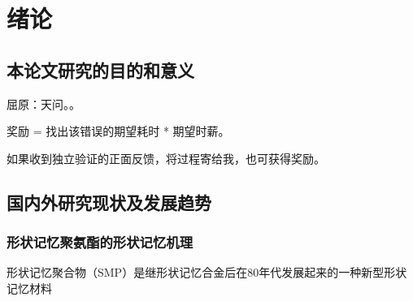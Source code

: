

\label{第一章开始}
\chapter{绪论}

\section{本论文研究的目的和意义}

屈原：天问。\cite{berryOpticalSingularitiesBirefringent2003,ossikovskiConstitutiveRelationsOptically2021}。

奖励 = 找出该错误的期望耗时 * 期望时薪。

如果收到独立验证的正面反馈，将过程寄给我，也可获得奖励。

\section{国内外研究现状及发展趋势}

\subsection{形状记忆聚氨酯的形状记忆机理}

形状记忆聚合物（SMP）是继形状记忆合金后在80年代发展起来的一种新型形状记忆材料



